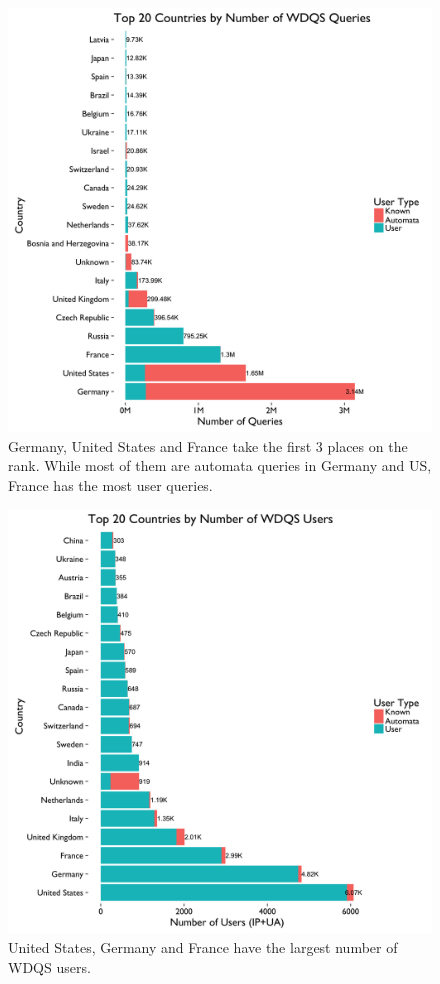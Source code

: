 \documentclass[12pt,]{article}
\begin{document}
\begin{figure}[H]
\centering
\includegraphics{figures/n_query_by_country.png}
\caption{Germany, United States and France take the first 3 places on
the rank. While most of them are automata queries in Germany and US,
France has the most user queries.}
\end{figure}

\begin{figure}[H]
\centering
\includegraphics{figures/n_user_by_country.png}
\caption{United States, Germany and France have the largest number of
WDQS users.}
\end{figure}
\end{document}
